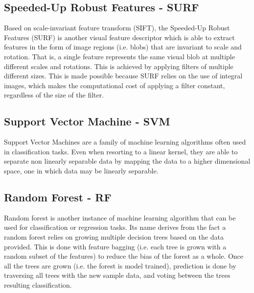 \documentclass[11pt]{article}
\begin{document}
    \subsection{Speeded-Up Robust Features - SURF}
        Based on scale-invariant feature transform (SIFT), the Speeded-Up Robust Features (SURF) is another visual feature descriptor which is able to extract features in the form of image regions (i.e. blobs) that are invariant to scale and rotation. That is, a single feature represents the same visual blob at multiple different scales and rotations. This is achieved by applying filters of multiple different sizes. This is made possible because SURF relies on the use of integral images, which makes the computational cost of applying a filter constant, regardless of the size of the filter.
    \subsection{Support Vector Machine - SVM}
        Support Vector Machines are a family of machine learning algorithms often used in classification tasks. Even when resorting to a linear kernel, they are able to separate non linearly separable data by mapping the data to a higher dimensional space, one in which data may be linearly separable.
    \subsection{Random Forest - RF}
        Random forest is another instance of machine learning algorithm that can be used for classification or regression tasks. Its name derives from the fact a random forest relies on growing multiple decision trees based on the data provided. This is done with feature bagging (i.e. each tree is grown with a random subset of the features) to reduce the bias of the forest as a whole. Once all the trees are grown (i.e. the forest is model trained), prediction is done by traversing all trees with the new sample data, and voting between the trees resulting classification.
\end{document}
